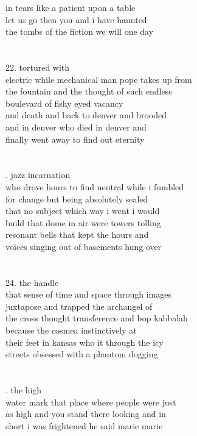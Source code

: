 \documentclass{article}
\begin{document}
in tears like a patient upon a table\\
let us go then you and i have haunted\\
the tombs of the fiction we will one day\\
\\
\\
22. tortured with\\
electric while mechanical man pope takes up from\\
the fountain and the thought of such endless\\
boulevard of fishy eyed vacancy\\
and death and back to denver and brooded\\
and in denver who died in denver and\\
finally went away to find out eternity\\
\\
\\
\newpage
{}. jazz incarnation\\
who drove hours to find neutral while i fumbled\\
for change but being absolutely sealed\\
that no subject which way i went i would\\
build that dome in air were towers tolling\\
resonant bells that kept the hours and\\
voices singing out of basements hung over\\
\\
\\
24. the handle\\
that sense of time and space through images\\
juxtapose and trapped the archangel of\\
the cross thought transference and bop kabbalah\\
because the cosmea instinctively at\\
their feet in kansas who it through the icy\\
streets obsessed with a phantom dogging\\
\\
\\
\newpage
{}. the high\\
water mark that place where people were just\\
as high and you stand there looking and in\\
short i was frightened he said marie marie\\
\end{document}
